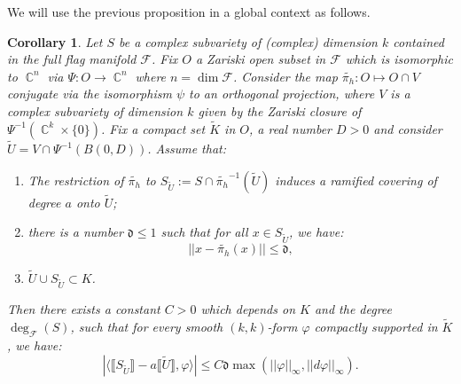 \documentclass[12pt]{amsbook}%
\newtheorem{cor}[thm]{Corollary}
\theoremstyle{definition}
\theoremstyle{remark}
\numberwithin{section}{chapter}
\numberwithin{subsection}{section}
\numberwithin{figure}{chapter}
\DeclareMathOperator{\C}{\mathbb{C}}
\newcommand\intcur[1]{\llbracket #1 \rrbracket}
\def\cF{{\mathscr{F}}}
\def\fd{{\mathfrak{d}}}
\begin{document}
{{We will use the previous proposition in a global context as follows. 
\begin{cor} \label{cor_subvariety_smaller_cylinder}
Let $S$ be a complex subvariety of (complex) dimension $k$ contained in the full flag manifold $\cF$. Fix $O$  a Zariski open subset in $\cF$ which is isomorphic to $\C^n$ via $ \Psi \colon O \to \C^n$  where $n = \dim \cF$.  Consider the  map $\tilde{\pi_h} \colon O \mapsto  O\cap V$ conjugate via the isomorphism $\psi$ to an orthogonal projection, where $V$ is a complex subvariety of dimension $k$ given by the Zariski closure of $\Psi^{-1}(\C^k \times \{ 0\})$. 
Fix a compact set $\tilde{K}$ in $O$, a real number $D>0$ and consider $\tilde{U} = V \cap \Psi^{-1} (B(0,D))$.  Assume that: 
\begin{enumerate}
\item[(i)] The restriction of $\tilde{\pi_h}$ to $S_{\tilde{U}} := S \cap \tilde{\pi_h}^{-1} (\tilde{U})$ induces a ramified covering of degree $a$ onto $\tilde{U}$;
\item[(ii)] there is a number $\fd \leqslant 1$ such that for all $x \in S_{\tilde{U}}$, we have: 
\begin{equation*}
 || x - \tilde{\pi_h}(x) || \leqslant \fd, 
\end{equation*}
\item[(iii)] $\tilde{U} \cup S_{\tilde{U}} \subset K$.
\end{enumerate}
 Then there exists a constant $C>0$ which depends on $K$ and the degree $\deg_{\cF}(S)$, such that for every smooth $(k,k)$-form $\varphi$ compactly supported in $\tilde{K}$, we have: 
 \begin{equation*}
 | \langle \intcur{S_{\tilde{U}}} - a \intcur{\tilde{U}} ,\varphi \rangle  | \leqslant C \fd \max(||\varphi||_\infty, || d\varphi||_{\infty}).
 \end{equation*}
\end{cor}

}}
\end{document}
